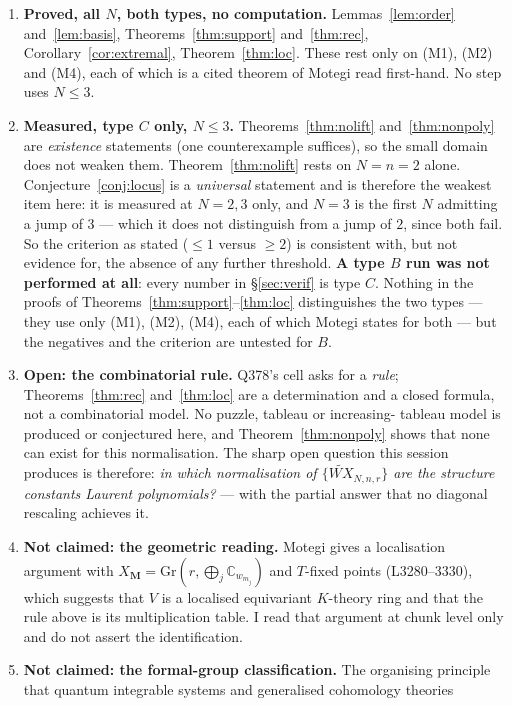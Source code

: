 \documentclass[11pt]{article}
\theoremstyle{plain}
\theoremstyle{definition}
\theoremstyle{remark}
\newcommand{\bM}{\mathbf{M}}
\newcommand{\WXt}{\widetilde{W\!X}}
\begin{document}
\begin{enumerate}
\item \textbf{Proved, all $N$, both types, no computation.}
Lemmas~\ref{lem:order} and~\ref{lem:basis}, Theorems~\ref{thm:support}
and~\ref{thm:rec}, Corollary~\ref{cor:extremal}, Theorem~\ref{thm:loc}.  These
rest only on (M1), (M2) and (M4), each of which is a cited theorem of
Motegi read first-hand.  No step uses $N\le3$.
\item \textbf{Measured, type $C$ only, $N\le3$.}
Theorems~\ref{thm:nolift} and~\ref{thm:nonpoly} are \emph{existence}
statements (one counterexample suffices), so the small domain does not weaken
them.  Theorem~\ref{thm:nolift} rests on $N=n=2$ alone.
Conjecture~\ref{conj:locus} is a \emph{universal} statement and is therefore the
weakest item here: it is measured at $N=2,3$ only, and $N=3$ is the first $N$
admitting a jump of $3$ --- which it does not distinguish from a jump of $2$,
since both fail.  So the criterion as stated ($\le1$ versus $\ge2$) is
consistent with, but not evidence for, the absence of any further threshold.
\textbf{A type $B$ run was not performed at all}: every number in
\S\ref{sec:verif} is type $C$.  Nothing in the proofs of
Theorems~\ref{thm:support}--\ref{thm:loc} distinguishes the two types --- they
use only (M1), (M2), (M4), each of which Motegi states for both --- but the
negatives and the criterion are untested for $B$.
\item \textbf{Open: the combinatorial rule.}  Q378's cell asks for a
\emph{rule}; Theorems~\ref{thm:rec} and~\ref{thm:loc} are a determination and a
closed formula, not a combinatorial model.  No puzzle, tableau or increasing-%
tableau model is produced or conjectured here, and
Theorem~\ref{thm:nonpoly} shows that none can exist for this normalisation.  The
sharp open question this session produces is therefore: \emph{in which
normalisation of $\{\WXt_{N,n,r}\}$ are the structure constants Laurent
polynomials?} --- with the partial answer that no diagonal rescaling achieves it.
\item \textbf{Not claimed: the geometric reading.}  Motegi gives a localisation
argument with $X_{\bM}=\mathrm{Gr}(r,\bigoplus_j\mathbb C_{w_{m_j}})$ and
$T$-fixed points (L3280--3330), which suggests that $V$ is a localised
equivariant $K$-theory ring and that the rule above is its multiplication table.
I read that argument at chunk level only and do not assert the identification.
\item \textbf{Not claimed: the formal-group classification.}  The organising
principle that quantum integrable systems and generalised cohomology theories

\end{enumerate}
\end{document}
